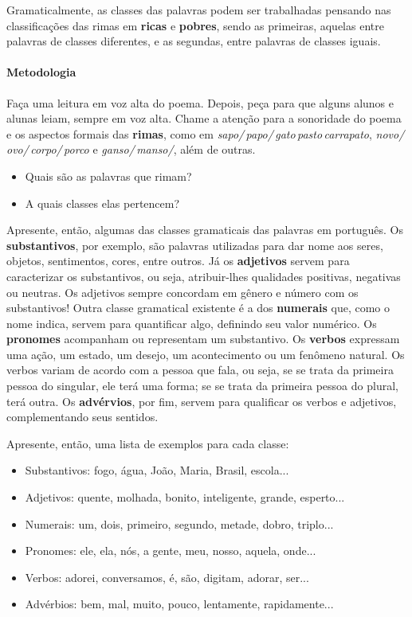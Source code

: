 \documentclass[11pt]{extarticle}
\begin{document}
Gramaticalmente, as classes das palavras podem ser trabalhadas
pensando nas classificações das rimas em \textbf{ricas} e \textbf{pobres},
sendo as primeiras, aquelas entre palavras de classes diferentes,
e as segundas, entre palavras de classes iguais. 

\paragraph{Metodologia} Faça uma leitura em voz alta do poema.
Depois, peça para que alguns alunos e alunas leiam, 
sempre em voz alta.
Chame a atenção para a sonoridade do poema e os aspectos formais
das \textbf{rimas}, como em \textit{sapo/\,papo/\,gato\,pasto\,carrapato}, \textit{novo/\,ovo/\,corpo/\,porco} e
\textit{ganso/\,manso/}, além de outras.

\begin{itemize}
\item Quais são as palavras que rimam? 
\item A quais classes elas pertencem?
\end{itemize}

Apresente, então, algumas das classes gramaticais das 
palavras em português.
Os \textbf{substantivos}, por exemplo, são palavras utilizadas
para dar nome aos seres, objetos, sentimentos, cores, entre outros.
Já os \textbf{adjetivos} servem para caracterizar os substantivos,
ou seja, atribuir-lhes qualidades positivas, negativas ou neutras. 
Os adjetivos sempre concordam em gênero e número com os substantivos!
Outra classe gramatical existente é a dos \textbf{numerais} que, como
o nome indica, servem para quantificar algo, definindo seu valor numérico. 
Os \textbf{pronomes} acompanham ou representam um substantivo.
Os \textbf{verbos} expressam uma ação, um estado, um desejo,
um acontecimento ou um fenômeno natural. Os verbos variam de acordo
com a pessoa que fala, ou seja, se se trata da primeira pessoa
do singular, ele terá uma forma; se se trata da primeira pessoa do
plural, terá outra. 
Os \textbf{advérvios}, por fim, servem para qualificar os verbos e adjetivos,
complementando seus sentidos.

Apresente, então, uma lista de exemplos para cada classe:

\begin{itemize}
	\item Substantivos: fogo, água, João, Maria, Brasil, escola...
	\item Adjetivos: quente, molhada, bonito, inteligente, grande, esperto...
	\item Numerais: um, dois, primeiro, segundo, metade, dobro, triplo...
	\item Pronomes: ele, ela, nós, a gente, meu, nosso, aquela, onde...
	\item Verbos: adorei, conversamos, é, são, digitam, adorar, ser...
	\item Advérbios: bem, mal, muito, pouco, lentamente, rapidamente...
\end{itemize}
\end{document}
